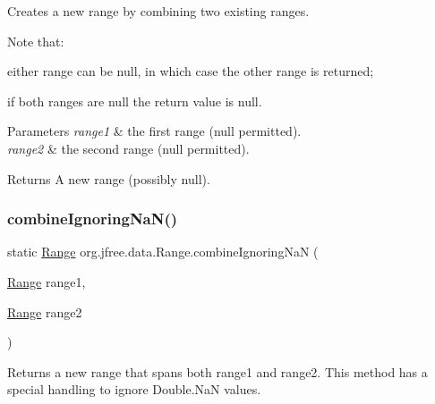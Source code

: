 Creates a new range by combining two existing ranges. 

Note that\+: 
\begin{DoxyItemize}
\item either range can be {\ttfamily null}, in which case the other range is returned; 
\item if both ranges are {\ttfamily null} the return value is {\ttfamily null}. 
\end{DoxyItemize}


\begin{DoxyParams}{Parameters}
{\em range1} & the first range ({\ttfamily null} permitted). \\
\hline
{\em range2} & the second range ({\ttfamily null} permitted).\\
\hline
\end{DoxyParams}
\begin{DoxyReturn}{Returns}
A new range (possibly {\ttfamily null}). 
\end{DoxyReturn}
\mbox{\label{classorg_1_1jfree_1_1data_1_1_range_a820962f424990e7f42bdcc86f43a417f}} 
\subsubsection{\texorpdfstring{combine\+Ignoring\+Na\+N()}{combineIgnoringNaN()}}
{\footnotesize\ttfamily static \mbox{\hyperlink{classorg_1_1jfree_1_1data_1_1_range}{Range}} org.\+jfree.\+data.\+Range.\+combine\+Ignoring\+NaN (\begin{DoxyParamCaption}\item[{\mbox{\hyperlink{classorg_1_1jfree_1_1data_1_1_range}{Range}}}]{range1,  }\item[{\mbox{\hyperlink{classorg_1_1jfree_1_1data_1_1_range}{Range}}}]{range2 }\end{DoxyParamCaption})\hspace{0.3cm}{\ttfamily [static]}}

Returns a new range that spans both {\ttfamily range1} and {\ttfamily range2}. This method has a special handling to ignore Double.\+NaN values.


